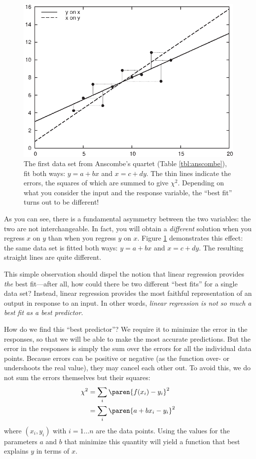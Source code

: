 \begin{figure}
  \centerline{\includegraphics{img/regressionxy}}
  \caption{The first data set from Anscombe's quartet (Table
    \ref{tbl:anscombe}), fit both ways: $y = a + bx$ and $x = c + d
    y$. The thin lines indicate the errors, the squares of which are
    summed to give $\chi^2$. Depending on what you consider the input
    and the response variable, the ``best fit'' turns out to be
    different!}
  \label{fig:regressionxy}
\end{figure}

As you can see, there is a fundamental asymmetry between the two
variables: the two are not interchangeable.  In fact, you will obtain
a \emph{different} solution when you regress $x$ on $y$ than when you
regress $y$ on $x$. Figure \ref{fig:regressionxy} demonstrates this
effect: the same data set is fitted both ways: $y = a + bx$ and $x = c
+ d y$. The resulting straight lines are quite different.

This simple observation should dispel the notion that linear
regression provides \emph{the} best fit---after all, how could there
be two different ``best fits'' for a single\vadjust{\pagebreak} data set? Instead, linear
regression provides the most faithful representation of an output in
response to an input. In other words, \emph{linear regression is not
  so much a best fit as a best predictor}.

How do we find this ``best predictor''? We require it to minimize the
error in the responses, so that we will be able to make the most
accurate predictions.  But the error in the responses is simply the
sum over the errors for all the individual data points. Because errors
can be positive or negative (as the function over- or undershoots the
real value), they may cancel each other out. To avoid this, we do not sum
the errors themselves but their squares:
%
\begin{align*}
\chi^2 & = \sum_i \paren{ f(x_i) - y_i }^2 \\
       & = \sum_i \paren{ a + b x_i - y_i }^2
\end{align*}
%
where $(x_i, y_i)$ with $i=1 \dots n$ are the data points.  Using the
values for the parameters $a$ and $b$ that minimize this quantity will
yield a function that best explains $y$ in terms of $x$.


